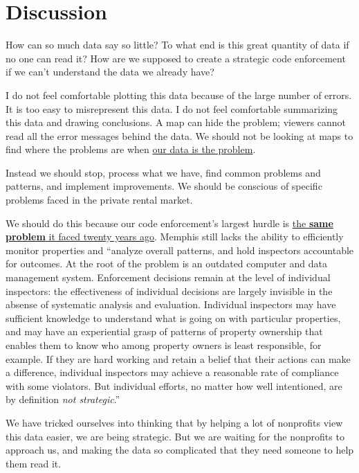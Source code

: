 \documentclass[
]{book}
\begin{document}
\hypertarget{discussion}{%
\chapter{Discussion}\label{discussion}}

How can so much data say so little? To what end is this great quantity of data if no one can read it? How are we supposed to create a strategic code enforcement if we can't understand the data we already have?

I do not feel comfortable plotting this data because of the large number of errors. It is too easy to misrepresent this data. I do not feel comfortable summarizing this data and drawing conclusions. A map can hide the problem; viewers cannot read all the error messages behind the data. We should not be looking at maps to find where the problems are when \underline{our data is the problem}.

Instead we should stop, process what we have, find common problems and patterns, and implement improvements. We should be conscious of specific problems faced in the private rental market.

We should do this because our code enforcement's largest hurdle is \underline{the \textbf{same problem} it faced twenty years ago}. Memphis still lacks the ability to efficiently monitor properties and ``analyze overall patterns, and hold inspectors accountable for outcomes. At the root of the problem is an outdated computer and data management system. Enforcement decisions remain at the level of individual inspectors: the effectiveness of individual decisions are largely invisible in the absense of systematic analysis and evaluation. Individual inspectors may have sufficient knowledge to understand what is going on with particular properties, and may have an experiential grasp of patterns of property ownership that enables them to know who among property owners is least responsible, for example. If they are hard working and retain a belief that their actions can make a difference, individual inspectors may achieve a reasonable rate of compliance with some violators. But individual efforts, no matter how well intentioned, are by definition \emph{not strategic}.'' \citep[44]{betts2001}

We have tricked ourselves into thinking that by helping a lot of nonprofits view this data easier, we are being strategic. But we are waiting for the nonprofits to approach us, and making the data so complicated that they need someone to help them read it.
\end{document}
